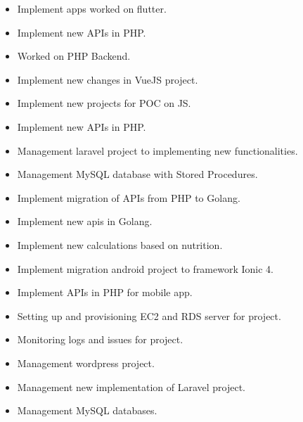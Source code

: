 \divider

\begin{itemize}
    \item Implement apps worked on flutter.
    \item Implement new APIs in PHP.
    \item Worked on PHP Backend.
\end{itemize}

\divider

\begin{itemize}
    \item Implement new changes in VueJS project.
    \item Implement new projects for POC on JS.
    \item Implement new APIs in PHP.
    \item Management laravel project to implementing new functionalities.
    \item Management MySQL database with Stored Procedures.
    \item Implement migration of APIs from PHP to Golang.
    \item Implement new apis in Golang.
    \item Implement new calculations based on nutrition.
\end{itemize}

\divider

\begin{itemize}
    \item Implement migration android project to framework Ionic 4.
    \item Implement APIs in PHP for mobile app.
    \item Setting up and provisioning EC2 and RDS server for project.
    \item Monitoring logs and issues for project.
    \item Management wordpress project.
    \item Management new implementation of Laravel project.
    \item Management MySQL databases.
\end{itemize}
